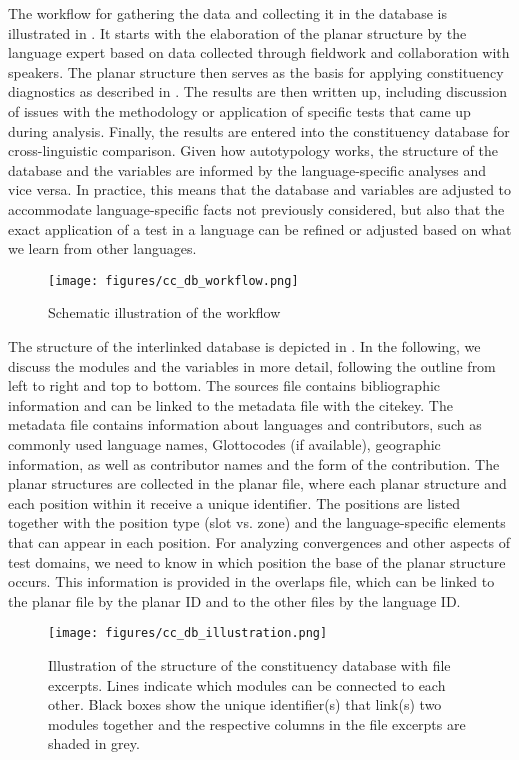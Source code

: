 \documentclass[output=paper,draftmode]{langscibook}
\begin{document}
The workflow for gathering the data and collecting it in the database is illustrated in . It starts with the elaboration of the planar structure by the language expert based on data collected through fieldwork and collaboration with speakers.
The planar structure then serves as the basis for applying constituency diagnostics as described in . The results are then written up, including discussion of issues with the methodology or application of specific tests that came up during analysis.
Finally, the results are entered into the constituency database for cross-linguistic comparison. Given how autotypology works, the structure of the database and the variables are informed by the language-specific analyses and vice versa. In practice, this means that the database and variables are adjusted to accommodate language-specific facts not previously considered, but also that the exact application of a test in a language can be refined or adjusted based on what we learn from other languages.

\begin{figure}
    \texttt{[image: figures/cc\_db\_workflow.png]}
    \caption{Schematic illustration of the workflow}
    \label{fig:workflow}
\end{figure}

The structure of the interlinked database is depicted in . In the following, we discuss the modules and the variables in more detail, following the outline from left to right and top to bottom.
The sources file contains bibliographic information and can be linked to the metadata file with the citekey.
The metadata file contains information about languages and contributors, such as commonly used language names, Glottocodes (if available), geographic information, as well as contributor names and the form of the contribution.
The planar structures are collected in the planar file, where each planar structure and each position within it receive a unique identifier. The positions are listed together with the position type (slot vs. zone) and the language-specific elements that can appear in each position. 
For analyzing convergences and other aspects of test domains, we need to know in which position the base of the planar structure occurs. This information is provided in the overlaps file, which can be linked to the planar file by the planar ID and to the other files by the language ID.

\begin{figure}
    \texttt{[image: figures/cc\_db\_illustration.png]}
    \caption{Illustration of the structure of the constituency database with file excerpts. Lines indicate which modules can be connected to each other. Black boxes show the unique identifier(s) that link(s) two modules together and the respective columns in the file excerpts are shaded in grey.}
    \label{fig:db}
\end{figure}
\end{document}

